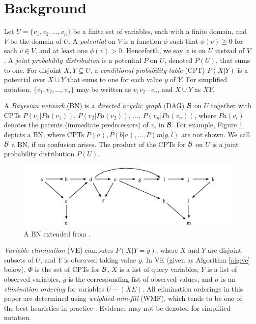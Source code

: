 \section{Background}
\label{sec:back}

Let $U = \{ v_1, v_2, \ldots , v_n \}$ be a finite set of variables, each with a finite domain, and $V$ be the domain of $U$.
A \emph{potential} on $V$ is a function $\phi$ such that $\phi(v) \geq 0$ for each $v \in V$, and at least one $\phi(v) > 0$.
Henceforth, we say $\phi$ is on $U$ instead of $V$.
A \emph{joint probability distribution} is a potential $P$ on $U$, denoted $P(U)$, that sums to one.
For disjoint $X,Y \subseteq U$, a \emph{conditional probability table} (CPT) $P(X|Y)$ is a potential over $X \cup Y$ that sums to one for each value $y$ of $Y$.
For simplified notation, $\{ v_1, v_2, \ldots, v_n \}$ may be written as $v_1 v_2 \cdots v_n$, and $X \cup Y$ as $XY$.

A \emph{Bayesian network} (BN) \cite{pear88} is a \emph{directed acyclic graph} (DAG) ${\cal B}$ on $U$ together with CPTs $P(v_1 | Pa(v_1))$, $P(v_2|Pa(v_2))$, $\ldots$, $P(v_n|Pa(v_n))$, where $Pa(v_i)$ denotes the parents (immediate predecessors) of $v_i$ in ${\cal B}$.
For example, Figure \ref{fig:dag} depicts a BN, where CPTs $P(a),P(b|a),\ldots,P(m|g,l)$ are not shown.
We call $\cal{B}$ a BN, if no confusion arises.
The product of the CPTs for $\cal{B}$ on $U$ is a joint probability distribution $P(U)$.

\begin{figure}[htb]
    \begin{center}
    	\includegraphics{figures/DAG.png}
		\caption{A BN extended from \cite{madsen99}.}
		\label{fig:dag}
    \end{center}
\end{figure}

\emph{Variable elimination} (VE) \cite{zhan94} computes $P(X|Y=y)$, where $X$ and $Y$ are disjoint subsets of $U$, and $Y$ is observed taking value $y$.
In VE (given as Algorithm \ref{alg:ve} below), $\Phi$ is the set of CPTs for ${\cal B}$, $X$ is a list of query variables, $Y$ is a list of observed variables, $y$ is the corresponding list of observed values, and $\sigma$ is an \emph{elimination ordering} \cite{Kja90} for variables $U - (XE)$.
All elimination orderings in this paper are determined using \emph{weighted-min-fill} (WMF), which tends to be one of the best heuristics in practice \cite{koll09}.
Evidence may not be denoted for simplified notation.

